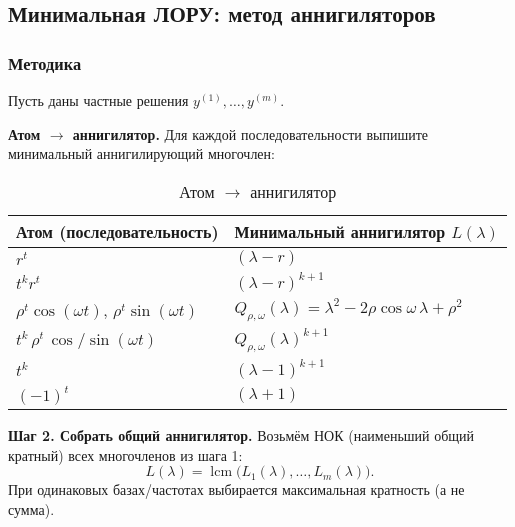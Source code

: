 \subsection{Минимальная ЛОРУ: метод аннигиляторов}\label{sec:min-lre}


\subsubsection*{Методика}

Пусть даны частные решения $y^{(1)},\ldots,y^{(m)}$.

\textbf{Атом $\to$ аннигилятор.} Для каждой последовательности выпишите минимальный аннигилирующий многочлен:
\begin{table}[h!]
\centering
\caption{Атом $\to$ аннигилятор}
\label{tab:atom-to-annihilator}
\begin{tabular}{|l|l|}
\hline
\textbf{Атом (последовательность)} & \textbf{Минимальный аннигилятор $L(\lambda)$} \\
\hline
$r^t$ & $(\lambda - r)$ \\
\hline
$t^k r^t$ & $(\lambda - r)^{k+1}$ \\
\hline
$\rho^t \cos(\omega t)$, $\rho^t \sin(\omega t)$ & $Q_{\rho,\omega}(\lambda)=\lambda^2-2\rho\cos\omega\,\lambda+\rho^2$ \\
\hline
$t^k \, \rho^t \, \cos/\sin(\omega t)$ & $Q_{\rho,\omega}(\lambda)^{k+1}$ \\
\hline
$t^k$ & $(\lambda-1)^{k+1}$ \\
\hline
$(-1)^t$ & $(\lambda+1)$ \\
\hline
\end{tabular}
\end{table}

\textbf{Шаг 2. Собрать общий аннигилятор.} Возьмём НОК (наименьший общий кратный) всех многочленов из шага 1:
\[
 L(\lambda)=\operatorname{lcm}\big(L_1(\lambda),\ldots,L_m(\lambda)\big).
\]
При одинаковых базах/частотах выбирается максимальная кратность (а не сумма).

